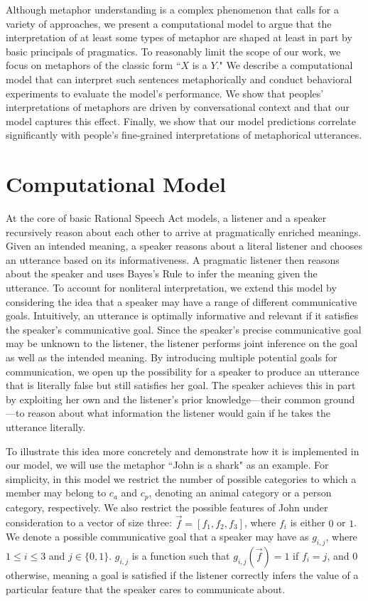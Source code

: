 \documentclass[10pt,letterpaper]{article}
\begin{document}
Although metaphor understanding is a complex phenomenon that calls for a variety of approaches, we present a computational model to argue that the interpretation of at least some types of metaphor are shaped at least in part by basic principals of pragmatics. To reasonably limit the scope of our work, we focus on metaphors of the classic form ``$X$ is a $Y$." We describe a computational model that can interpret such sentences metaphorically and conduct behavioral experiments to evaluate the model's performance. We show that peoples' interpretations of metaphors are driven by conversational context and that our model captures this effect. Finally, we show that our model predictions correlate significantly with people's fine-grained interpretations of metaphorical utterances.

\section{Computational Model}
At the core of basic Rational Speech Act models, a listener and a speaker recursively reason about each other to arrive at pragmatically enriched meanings. Given an intended meaning, a speaker reasons about a literal listener and chooses an utterance based on its informativeness. A pragmatic listener then reasons about the speaker and uses Bayes's Rule to infer the meaning given the utterance. To account for nonliteral interpretation, we extend this model by considering the idea that a speaker may have a range of different communicative goals. Intuitively, an utterance is optimally informative and relevant if it satisfies the speaker's communicative goal. Since the speaker's precise communicative goal may be unknown to the listener, the listener performs joint inference on the goal as well as the intended meaning. By introducing multiple potential goals for communication, we open up the possibility for a speaker to produce an utterance that is literally false but still satisfies her goal. The speaker achieves this in part by exploiting her own and the listener's prior knowledge---their common ground \cite{clark1996using}---to reason about what information the listener would gain if he takes the utterance literally. 

To illustrate this idea more concretely and demonstrate how it is implemented in our model, we will use the metaphor ``John is a shark" as an example. For simplicity, in this model we restrict the number of possible categories to which a member may belong to $c_a$ and $c_p$, denoting an animal category or a person category, respectively. We also restrict the possible features of John under consideration to a vector of size three: $\vec f = [f_1, f_2, f_3]$, where $f_i$ is either $0$ or $1$. We denote a possible communicative goal that a speaker may have as $g_{i,j}$, where $1 \leq i \leq 3$ and $j \in \{0,1\}$. $g_{i,j}$ is a function such that $g_{i,j} (\vec f) = 1$ if $f_i = j$, and $0$ otherwise, meaning a goal is satisfied if the listener correctly infers the value of a particular feature that the speaker cares to communicate about. 
\end{document}
